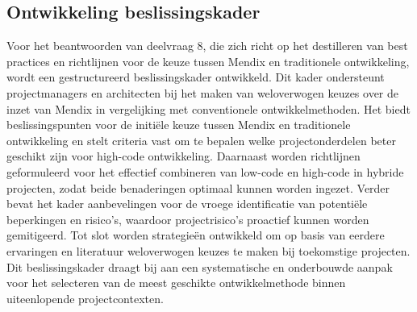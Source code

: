 \subsection{Ontwikkeling beslissingskader}
Voor het beantwoorden van deelvraag 8, die zich richt op het destilleren van best practices en richtlijnen voor de keuze tussen Mendix en traditionele ontwikkeling, wordt een gestructureerd beslissingskader ontwikkeld. Dit kader ondersteunt projectmanagers en architecten bij het maken van weloverwogen keuzes over de inzet van Mendix in vergelijking met conventionele ontwikkelmethoden. Het biedt beslissingspunten voor de initiële keuze tussen Mendix en traditionele ontwikkeling en stelt criteria vast om te bepalen welke projectonderdelen beter geschikt zijn voor high-code ontwikkeling. Daarnaast worden richtlijnen geformuleerd voor het effectief combineren van low-code en high-code in hybride projecten, zodat beide benaderingen optimaal kunnen worden ingezet. Verder bevat het kader aanbevelingen voor de vroege identificatie van potentiële beperkingen en risico’s, waardoor projectrisico’s proactief kunnen worden gemitigeerd. Tot slot worden strategieën ontwikkeld om op basis van eerdere ervaringen en literatuur weloverwogen keuzes te maken bij toekomstige projecten. Dit beslissingskader draagt bij aan een systematische en onderbouwde aanpak voor het selecteren van de meest geschikte ontwikkelmethode binnen uiteenlopende projectcontexten.


